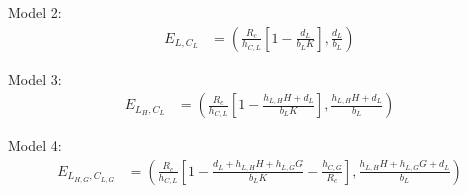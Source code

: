 \documentclass[11pt]{article}
\begin{document}
{Model 2:
\begin{align*}
E_{L, C_{L}} &= \left( \frac{R_{c}}{h_{C,L}} \left[ 1- \frac{d_{L}}{b_{L}K}\right], \frac{d_{L}}{b_{L}} \right)
\end{align*}

Model 3:
\begin{align*}
E_{L_{H}, C_{L}} &= \left( \frac{R_{c}}{h_{C,L}} \left[ 1- \frac{h_{L,H}H+d_{L}}{b_{L}K}\right], \frac{h_{L,H}H+d_{L}}{b_{L}} \right)
\end{align*}

Model 4:
\begin{align*}
E_{L_{H,G}, C_{L,G}} &= \left( \frac{R_{c}}{h_{C,L}}\left[ 1 - \frac{d_{L} + h_{L,H}H + h_{L,G}G}{b_{L}K} - \frac{h_{C,G}}{R_{c}}\right] , \frac{h_{L,H}H + h_{L,G}G + d_{L}}{b_{L}}\right)
\end{align*}

}
\end{document}
